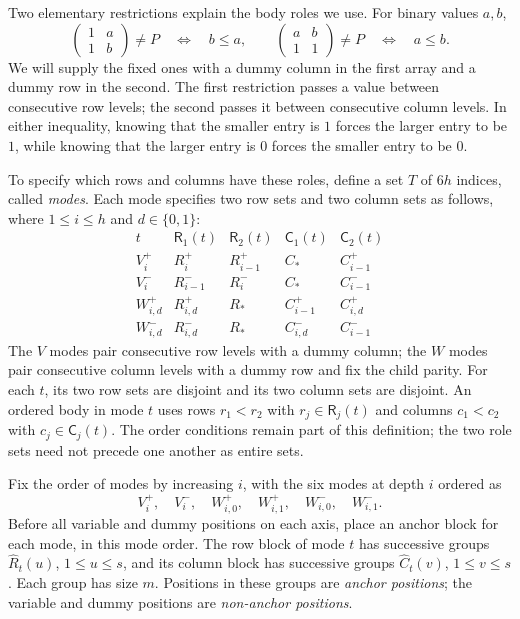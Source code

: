 Two elementary restrictions explain the body roles we use. For binary
values $a,b$,
\[
 \begin{pmatrix}1&a\\1&b\end{pmatrix}\ne P
       \quad\Longleftrightarrow\quad b\le a,
 \qquad
 \begin{pmatrix}a&b\\1&1\end{pmatrix}\ne P
       \quad\Longleftrightarrow\quad a\le b.
\]
We will supply the fixed ones with a dummy column in the first array
and a dummy row in the second. The first restriction passes a value
between consecutive row levels; the second passes it between
consecutive column levels. In either inequality, knowing that the
smaller entry is $1$ forces the larger entry to be $1$, while knowing
that the larger entry is $0$ forces the smaller entry to be $0$.

To specify which rows and columns have these roles, define a set $T$
of $6h$ indices, called \emph{modes}. Each mode specifies two row sets
and two column sets as follows, where $1\le i\le h$ and
$d\in\{0,1\}$:
\begin{equation}
 \begin{array}{c|cc|cc}
 t&\mathsf R_1(t)&\mathsf R_2(t)&\mathsf C_1(t)&\mathsf C_2(t)\\ \hline
 V_i^+&R_i^+&R_{i-1}^+&C_*&C_{i-1}^+\\
 V_i^-&R_{i-1}^-&R_i^-&C_*&C_{i-1}^-\\
 W_{i,d}^+&R_{i,d}^+&R_*&C_{i-1}^+&C_{i,d}^+\\
 W_{i,d}^-&R_{i,d}^-&R_*&C_{i,d}^-&C_{i-1}^-
 \end{array}
 \label{eq:body-modes}
\end{equation}
The $V$ modes pair consecutive row levels with a dummy column; the
$W$ modes pair consecutive column levels with a dummy row and fix the
child parity.
For each $t$, its two row sets are disjoint and its two column sets
are disjoint.  An ordered body in mode $t$ uses rows $r_1<r_2$ with
$r_j\in\mathsf R_j(t)$ and columns $c_1<c_2$ with
$c_j\in\mathsf C_j(t)$.  The order conditions remain part of this
definition; the two role sets need not precede one another as entire
sets.

Fix the order of modes by increasing $i$, with the six modes at depth
$i$ ordered as
\[
 V_i^+,\quad V_i^-,\quad W_{i,0}^+,\quad W_{i,1}^+,\quad
 W_{i,0}^-,\quad W_{i,1}^-.
\]
Before all variable and dummy positions on each axis, place an anchor
block for each mode, in this mode order.  The row block of mode $t$
has successive groups $\widehat R_t(u)$, $1\le u\le s$, and its
column block has successive groups $\widehat C_t(v)$, $1\le v\le s$.
Each group has size $m$.
Positions in these groups are \emph{anchor positions}; the variable
and dummy positions are \emph{non-anchor positions}.

